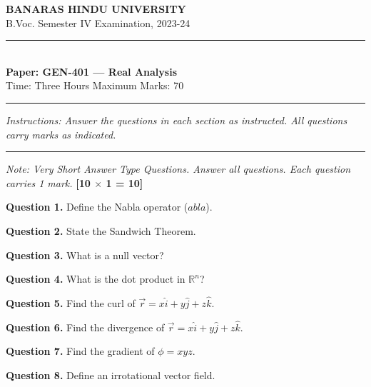 \documentclass[11pt,a4paper]{article}
\begin{document}
\begin{center}
  {\large\bfseries BANARAS HINDU UNIVERSITY}\\[2pt]
  {
\normalsize B.Voc. Semester IV Examination, 2023-24}\\[6pt]
  \rule{0.8\linewidth}{0.5pt}\\[6pt]
  {\large\bfseries Paper: GEN-401 --- Real Analysis}\\[4pt]
  {
\normalsize Time: Three Hours \hfill Maximum Marks: 70}
\end{center}

\rule{\linewidth}{0.4pt}

\smallskip



\noindent   \textit{Instructions: Answer the questions in each section as instructed. All questions carry marks as indicated.}

\bigskip

\bigskip


\rule{\linewidth}{0.4pt}\smallskip




\noindent   \textit{Note: Very Short Answer Type Questions. Answer all questions. Each question carries 1 mark.} \hfill   \textbf{[10 $ \times$ 1 = 10]}

\medskip


\noindent   \textbf{Question 1.} Define the Nabla operator ($
abla$).

\medskip


\noindent   \textbf{Question 2.} State the Sandwich Theorem.

\medskip


\noindent   \textbf{Question 3.} What is a null vector?

\medskip


\noindent   \textbf{Question 4.} What is the dot product in $\mathbb{R}^n$?

\medskip


\noindent   \textbf{Question 5.} Find the curl of $\vec{r} = x\hat{i} + y\hat{j} + z\hat{k}$.

\medskip


\noindent   \textbf{Question 6.} Find the divergence of $\vec{r} = x\hat{i} + y\hat{j} + z\hat{k}$.

\medskip


\noindent   \textbf{Question 7.} Find the gradient of $\phi = xyz$.

\medskip


\noindent   \textbf{Question 8.} Define an irrotational vector field.
\end{document}
